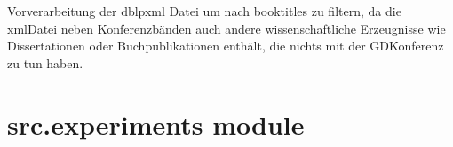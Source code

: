 \documentclass[a4paper,10pt,ngerman]{sphinxmanual}
\begin{document}

\begin{fulllineitems}
\label{\detokenize{api:src.dblp_parser.scan_booktitles}}
\pysigstartsignatures
\pysiglinewithargsret
{}
{\sphinxparamcomma {}}
{}
\pysigstopsignatures
\sphinxAtStartPar
Vorverarbeitung der dblp\sphinxhyphen{}xml Datei um nach booktitles zu filtern, da die xml\sphinxhyphen{}Datei neben Konferenzbänden auch andere wissenschaftliche Erzeugnisse wie Dissertationen oder Buchpublikationen enthält, die nichts mit der GD\sphinxhyphen{}Konferenz zu tun haben.
\begin{quote}\begin{description}
\sphinxAtStartPar
{}

\end{description}\end{quote}

\end{fulllineitems}



\section{src.experiments module}
\label{\detokenize{api:module-src.experiments}}\label{\detokenize{api:src-experiments-module}}
\end{document}
